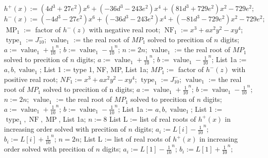 \documentclass[noend]{amsproc}
\theoremstyle{definition}
\DeclareMathOperator{\size}{size}
\DeclareMathOperator{\MP}{MP}
\DeclareMathOperator{\type}{type}
\DeclareMathOperator{\val}{value}
\DeclareMathOperator{\NF}{NF}
\begin{document}
\begin{algorithm}[ht]
\begin{algorithmic}[1]
\Else
\State $h^+(x):=(4d^3+27e^2)x^6+(-36d^3-243e^2)x^4+(81d^3+729e^2)x^2-729e^2;$
\State $h^-(x):=(-4d^3-27e^2)x^6+(-36d^3-243e^2)x^4+(-81d^3-729e^2)x^2-729e^2;$
\State $\MP_1 := $ factor of $h^-(z)$ with negative real root;
\State $\NF_1 := x^3+ax^2y^2-xy^4$;
\State $\type_1 := J_{10}^-$;
\State $\val_1$ := the real root of $MP_1$ solved to precition of $n$ digits;
\State $a:=\val_1+\frac{1}{10}^n$;
\State $b:=\val_1-\frac{1}{10}^n$;
\State $n:=2n$;
\State $\val_1$ := the real root of $MP_1$ solved to precition of $n$ digits;
\State $a:=\val_1+\frac{1}{10}^n$;
\State $b:=\val_1-\frac{1}{10}^n$;
\EndWhile
\State List 1a := $a,b,\val_1$;
\State List 1 := type 1, NF, MP, List 1a;
\Else
\State $MP_1 := $ factor of $h^-(z)$ with positive real root;
\State $NF_1 := x^3+ax^2y^2-xy^4$;
\State $\type_1 := J_{10}^-$;
\State $\val_1$ := the real root of $MP_1$ solved to precition of n digits;
\State $a:=\val_1+\frac{1}{10}^n$;
\State $b:=\val_1-\frac{1}{10}^n$;
\State $n:=2n$;
\State $\val_1$ := the real root of $MP_1$ solved to precition of $n$ digits;
\State $a:=\val_1+\frac{1}{10}^n$;
\State $b:=\val_1-\frac{1}{10}^n$;
\EndWhile
\State List 1a := $a,b,\val_1$;
\State List 1 := $\type_1, \NF, \MP$, List 1a;
\EndIf
\State $n:=8$
\State List L := list of real roots of $h^+(x)$ in increasing order solved with precition of $n$ digits;
\For{$i=1,\ldots,\size(L)$}
\State $a_i := L[i]-\frac{1}{10}^n$;
\State $b_i := L[i]+\frac{1}{10}^n$;
\EndFor
{}
\State $n=2n$;
\State List L := list of real roots of $h^+(x)$ in increasing order solved with precition of $n$ digits;
\For{$i=1,\ldots,\size(L)$}
\State $a_i := L[1]-\frac{1}{10}^n$;
\State $b_i := L[1]+\frac{1}{10}^n$;
\EndFor
\EndWhile
{}
\end{algorithmic}
\end{algorithm}
\end{document}
